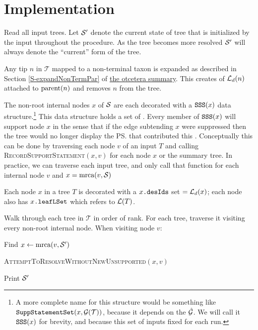 \documentclass[11pt]{article}
\newcommand{\summDoc}{\href{http://phylo.bio.ku.edu/ot/summarizing-taxonomy-plus-trees.pdf}{the otcetera summary}\xspace}
\newcommand{\summRef}[1]{Section \ref{S-#1} of \summDoc}
\begin{document}
\section*{Implementation}
\begin{compactenum}
    \item Read all input trees. Let $\mathcal{S}^{\prime}$ denote the current state of tree that is initialized by the input
    \summaryTree throughout the procedure. 
    As the tree becomes more resolved $\mathcal{S}^{\prime}$ will always denote the ``current'' form of the tree.
    \item Any tip $n$ in $\mathcal{T}$ mapped to a non-terminal taxon is expanded as described in \summRef{expandNonTermPar}.
    This creates of $\mathcal{L}_d(n)$ attached to $\mbox{parent}(n)$ and removes $n$ from the tree.
    \item The non-root internal nodes $x$ of $\mathcal{S}$ are each decorated with a  $\mbox{\texttt{SSS}}(x)$ data structure.\footnote{A
    more complete name for this structure would be something like $\mbox{\texttt{SuppStatementSet}}(x, \mathcal{G}(\mathcal{T}))$,
    because it depends on the $\hat{\mathcal{G}}$.
    We will call it $\mbox{\texttt{SSS}}(x)$ for brevity, and because this set of inputs fixed for each run.}
    This data structure holds a set of  {\incLSSSs}.
    Every member of $\mbox{\texttt{SSS}}(x)$ will support node $x$ in the
    sense that if the edge subtending $x$ were suppressed then the tree would no longer 
    display the \ps that contributed this \incLSSS.
    Conceptually this can be done by traversing each node $v$ of an input $T$
    and calling \textsc{RecordSupportStatement}$(x, v)$ for each node $x$ or the summary tree.
    In practice, we can traverse each input tree, and only call that function for each internal node $v$ and $x=\mbox{mrca}(v, \mathcal{S})$
    \item Each node $x$ in a tree $T$ is decorated with a ${x}\texttt{.desIds}$ set $=\mathcal{L}_d(x)$;
    each node also has ${x}\texttt{.leafLSet}$ which refers to $\mathcal{L}(T)$.
    \item Walk through each tree in $\mathcal{T}$ in order of rank. For each tree, 
    traverse it visiting every non-root internal node.
    When visiting node $v$:
    \begin{compactenum}
        \item Find $x \leftarrow \mbox{mrca}(v, \mathcal{S}^{\prime})$
        \item \textsc{AttemptToResolveWithoutNewUnsupported}$(x, v)$
   \end{compactenum}
   \item Print $\mathcal{S}^{\prime}$
\end{compactenum}
\end{document}
